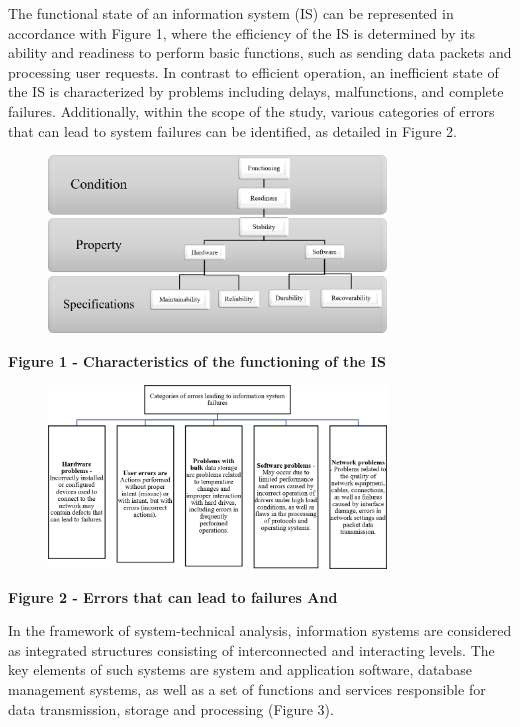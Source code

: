 The functional state of an information system (IS) can be represented in
accordance with Figure 1, where the efficiency of the IS is determined
by its ability and readiness to perform basic functions, such as sending
data packets and processing user requests. In contrast to efficient
operation, an inefficient state of the IS is characterized by problems
including delays, malfunctions, and complete failures. Additionally,
within the scope of the study, various categories of errors that can
lead to system failures can be identified, as detailed in Figure 2.

\begin{figure}[H]
	\centering
	\includegraphics[width=0.8\textwidth]{assets/43}
	\caption*{}
\end{figure}

\textbf{Figure 1 - Characteristics of the functioning of the IS}

\begin{figure}[H]
	\centering
	\includegraphics[width=0.8\textwidth]{assets/44}
	\caption*{}
\end{figure}

\textbf{Figure 2 - Errors that can lead to failures And}

In the framework of system-technical analysis, information systems are
considered as integrated structures consisting of interconnected and
interacting levels. The key elements of such systems are system and
application software, database management systems, as well as a set of
functions and services responsible for data transmission, storage and
processing (Figure 3).

